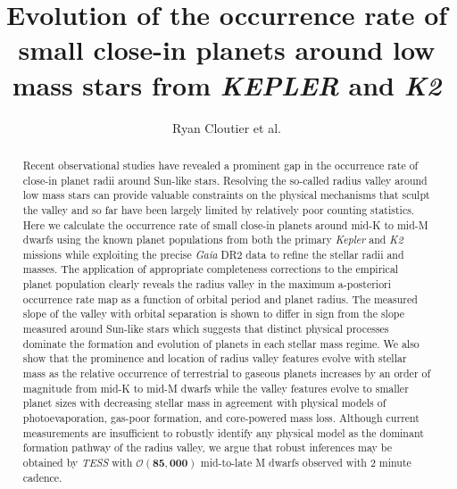\documentclass[twocolumn]{emulateapj}
\newcommand{\gaia}[1]{\emph{Gaia}#1}
\newcommand{\kepler}[1]{\emph{Kepler}#1}
\newcommand{\ktwo}[1]{\emph{K2}#1}
\newcommand{\tess}[1]{\emph{TESS}#1}
\begin{document}
\title{Evolution of the occurrence rate of small close-in planets around low mass stars from \emph{KEPLER} and \emph{K2}}
\author{Ryan Cloutier et al.}



\begin{abstract}
  Recent observational studies have revealed a prominent gap in the occurrence rate
  of close-in planet radii around Sun-like stars.
  Resolving the so-called radius valley around low mass stars can provide valuable
  constraints on the physical mechanisms that sculpt the valley and so far have been largely limited
  by relatively poor counting statistics.
  Here we calculate the occurrence rate of small close-in planets around mid-K to mid-M dwarfs
  using the known planet populations from both the primary \kepler{} and \ktwo{} missions while
  exploiting the precise \gaia{} DR2 data to refine the stellar radii and masses. 
  The application of appropriate completeness corrections to the empirical planet population
  clearly reveals the radius valley in the maximum a-posteriori occurrence rate map as a
  function of orbital period and planet radius. The measured slope of the valley with orbital separation
  is shown to differ in sign from the slope measured around Sun-like stars which suggests that
  distinct physical processes dominate the formation and evolution of planets in each stellar mass regime.
  We also show that the prominence and location of radius valley features evolve with stellar mass as
  the relative occurrence of terrestrial to gaseous planets increases by an order of magnitude from mid-K to
  mid-M dwarfs while the valley features evolve to smaller
  planet sizes with decreasing stellar mass in agreement with physical models of photoevaporation,
  gas-poor formation, and core-powered mass loss. Although current measurements are
  insufficient to robustly identify any physical model as the dominant formation pathway of the radius valley,
  we argue that robust inferences may be obtained by \tess{} with $\mathcal{O}(\mathbf{85,000})$
  mid-to-late M dwarfs observed with 2 minute cadence.
\end{abstract}
\end{document}
